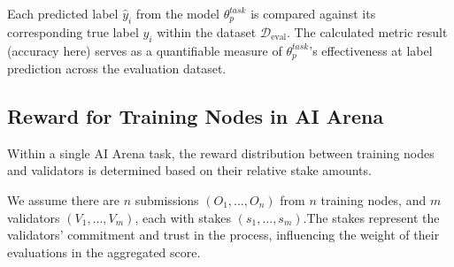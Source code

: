 \documentclass[conference]{IEEEtran}
\newcommand{\SNT}{{AI Arena}\xspace}
\begin{document}
Each predicted label $\hat{y}_i$ from the model $\theta^{task}_p$ is compared against its corresponding true label $y_i$ within the dataset $\mathcal{D}_{\text{eval}}$. The calculated metric result (accuracy here) serves as a quantifiable measure of $\theta^{task}_p$'s effectiveness at label prediction across the evaluation dataset. 






\subsection{Reward for Training Nodes in \SNT}\label{sec: reward-for-training-nodes}













Within a single AI Arena task, the reward distribution between training nodes and validators is determined based on their relative stake amounts.

We assume there are $n$ submissions $(O_1, \ldots, O_n)$ from $n$ training nodes, and $m$ validators $(V_1, \ldots, V_m)$, each with stakes $(s_1, \ldots, s_m)$.The stakes represent the validators' commitment and trust in the process, influencing the weight of their evaluations in the aggregated score.
\end{document}
